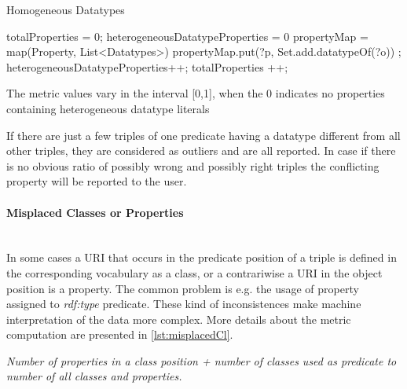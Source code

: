 
\begin{algorithm}
\caption{Homogeneous Datatypes}\label{lst:heterogeneous}
\begin{algorithmic}[1]
\State totalProperties = 0;
\State heterogeneousDatatypeProperties = 0
\State  propertyMap = map(Property, List<Datatypes>)
\EndProcedure
{}
  propertyMap.put(?p, Set.add.datatypeOf(?o)) \EndIf;
\EndProcedure
{}
 heterogeneousDatatypeProperties++; 
\EndIf
totalProperties ++;
\EndFor
{}
\EndProcedure
\end{algorithmic}
\end{algorithm}

The metric values vary in the interval [0,1], when the 0 indicates no properties containing heterogeneous datatype literals

If there are just a few triples of one predicate having a datatype different from all other triples, they are considered as outliers and are all reported.
In case if there is no obvious ratio of possibly wrong and possibly right triples the conflicting property will be reported to the user.
  
\paragraph{Misplaced Classes or Properties} ~\\

In some cases a URI that occurs in the predicate position of a triple is defined in the corresponding vocabulary as a class, or a contrariwise a URI in the object position is a property.
The common problem is e.g. the usage of property assigned to \textit{rdf:type} predicate.  
These kind of inconsistences make machine interpretation of the data more complex.
More details about the metric computation are presented in \ref{lst:misplacedCl}.


\begin{mdframed}[style=metricdefinition]
\emph{Number of properties in a class position + number of classes used as predicate to number of all classes and properties.}
\end{mdframed}


